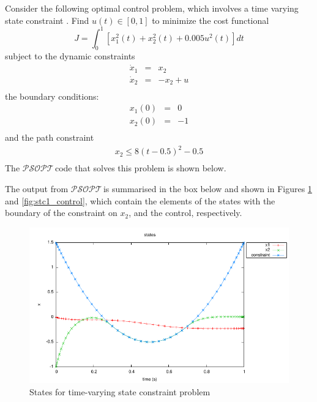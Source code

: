 \documentclass[a4paper,11pt]{report}    %
\newcommand{\psopt}{$\mathcal{PSOPT}$\,}  %
\newenvironment{shadedframe}{%
  \def\FrameCommand{\fcolorbox{black}{shadecolor}}%
  \MakeFramed {\FrameRestore}}
{\endMakeFramed}
\begin{document}
Consider the following optimal control problem, which involves a time varying
state constraint \cite{Teo:91}.  Find $u(t) \in [0, 1]$ 
to minimize the cost functional
\begin{equation}
  J = \int_0^1 [x_1^2(t)+x_2^2(t) + 0.005u^2(t) ]dt
\end{equation}
subject to the dynamic constraints
\begin{equation}
  \begin{array}{lcl}
   \dot x_1 &=& x_2 \\
   \dot x_2 &=& -x_2 + u\\
  \end{array}
\end{equation}
the boundary conditions:
 \begin{equation}
  \begin{array}{lcl}
   x_1(0) &=& 0 \\
   x_2(0) &=& -1 \\
  \end{array}
\end{equation}
and the path constraint
\begin{equation}
\begin{aligned}
  x_2 \le 8(t-0.5)^2 - 0.5  \\
\end{aligned}
\end{equation}
The
\psopt code that solves this problem is shown below.  

\tiny
\begin{shadedframe}

\end{shadedframe}
\normalsize

The output from \psopt is summarised in the box below and shown in Figures \ref{fig:stc1_states} and \ref{fig:stc1_control}, which contain the elements
of the states with the boundary of the constraint on $x_2$, and the control, respectively.

\begin{shadedframe}

\end{shadedframe}

\begin{figure}
  \centering 
  \includegraphics{../examples/stc1/stc1_states}
  \caption{States for time-varying state constraint problem}
 \label{fig:stc1_states}
\end{figure}
\end{document}
